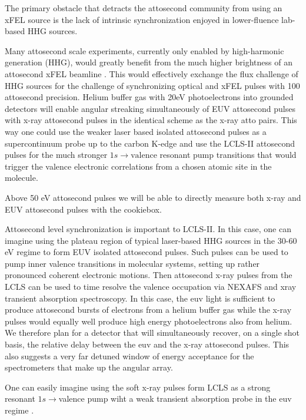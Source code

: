 The primary obstacle that detracts the attosecond community from using an xFEL source is the lack of intrinsic synchronization enjoyed in lower-fluence lab-based HHG sources.


Many attosecond scale experiments, currently only enabled by high-harmonic generation (HHG)\cite{Lewenstein1994,Hentschel2001,Chen2014,Schmidt2016,WornerSci2017}, would greatly benefit from the much higher brightness of an attosecond xFEL beamline \cite{Ding2009,Xiang2009}.
This would effectively exchange the flux challenge of HHG sources for the challenge of synchronizing optical and xFEL pulses with 100 attosecond precision.
Helium buffer gas with 20eV photoelectrons into grounded detectors will enable angular streaking simultaneously of EUV attosecond pulses with x-ray attosecond pulses in the identical scheme as the x-ray atto pairs.
This way one could use the weaker laser based isolated attosecond pulses \cite{Biegert2016} as a supercontinuum probe up to the carbon K-edge and use the LCLS-II attosecond pulses for the much stronger $1s\rightarrow\mbox{valence}$ resonant pump transitions that would trigger the valence electronic correlations from a chosen atomic site in the molecule.

Above 50 eV attosecond pulses we will be able to directly measure both x-ray and EUV attosecond pulses with the cookiebox.

Attosecond level synchronization is important to LCLS-II.
In this case, one can imagine using the plateau region of typical laser-based HHG sources in the 30-60 eV regime to form EUV isolated attosecond pulses.
Such pulses can be used to pump inner valence transitions in molecular systems, setting up rather pronounced coherent electronic motions.
Then attosecond x-ray pulses from the LCLS can be used to time resolve the valence occupation via NEXAFS and xray transient absorption spectroscopy.
In this case, the euv light is sufficient to produce attosecond bursts of electrons from a helium buffer gas while the x-ray pulses would equally well produce high energy photoelectrons also from helium.
We therefore plan for a detector that will simultaneously recover, on a single shot basis, the relative delay between the euv and the x-ray attosecond pulses.
This also suggests a very far detuned window of energy acceptance for the spectrometers that make up the angular array.

One can easily imagine using the soft x-ray pulses form LCLS as a strong resonant $1s\rightarrow$valence pump wiht a weak transient absorption probe in the euv regime \cite{Biegert2014,Biegert2016,WornerSci2017}.
